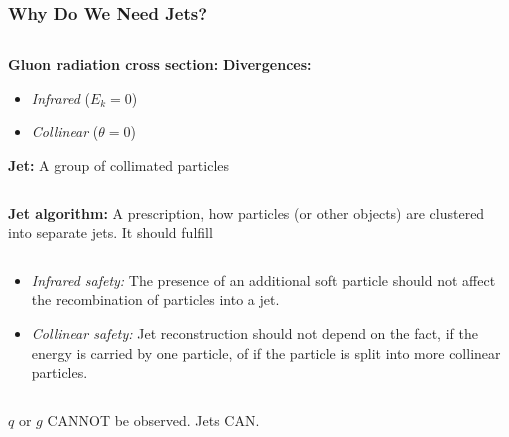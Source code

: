 \documentclass[compress]{beamer}
\begin{document}
\begin{frame}
\frametitle{Why Do We Need Jets?}
\begin{columns}[onlytextwidth]
  \begin{column}{0.5\textwidth}
    \textbf{Gluon radiation cross section:}
    \textbf{Divergences:}
    \begin{itemize}
      \item \textit{\color{red}Infrared} ($E_k = 0$)
      \item \textit{\color{red}Collinear} ($\theta = 0$)
    \end{itemize}
    \textbf{Jet:} A group of collimated particles
  \end{column}
  \begin{column}{0.5\textwidth}
    \begin{equation*}
      \sigma_{q \rightarrow qg} \sim \frac{d\theta}{|\sin\theta|}
      \frac{dE_k}{E_k}
    \end{equation*}
    \begin{figure}[b]
      \centering
      \texttt{[image: \{../PrezentationATLASmeeting/gluonRadiation]}.png}
    \end{figure}
  \end{column}
\end{columns}
\textbf{Jet algorithm:} A prescription, how particles (or other objects) are clustered
  into separate jets. It should fulfill
\begin{columns}[onlytextwidth]
  \begin{column}{0.7\textwidth}
      \begin{itemize}
        \item \textit{Infrared safety:} The presence of an additional soft particle
          should not affect the recombination of particles into a jet.
        \item \textit{Collinear safety:} Jet reconstruction should not depend on the
          fact, if the energy is carried by one particle, of if the particle is
          split into more collinear particles.
      \end{itemize}
  \end{column}
  \begin{column}{0.3\textwidth}
    \begin{figure}[b]
      \centering
      \texttt{[image: \{../PrezentationATLASmeeting/clustering]}.png}
    \end{figure}
  \end{column}
\end{columns}
$q$ or $g$ {\color{red}CANNOT} be observed. Jets {\color{red}CAN}.
\end{frame}
\end{document}
